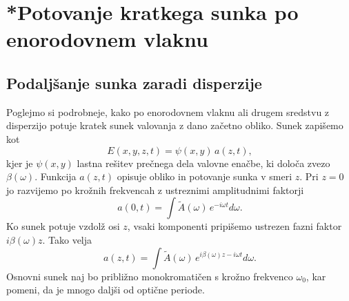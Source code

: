 \section{*Potovanje kratkega sunka po enorodovnem vlaknu}
\label{chap:sunvl}
\subsection*{Podaljšanje sunka zaradi disperzije}
Poglejmo si podrobneje, kako po enorodovnem vlaknu ali drugem
sredstvu z disperzijo potuje kratek sunek valovanja z dano začetno obliko.
Sunek zapišemo kot  
\begin{equation}
E\left(x, y, z, t\right)=\psi\left(x,y\right)\, a\left(z,t\right),
\label{9.61}
\end{equation}
kjer je $\psi\left(x,y\right)$ lastna rešitev prečnega dela valovne
enačbe, ki določa zvezo $\beta\left(\omega\right)$. 
Funkcija $a\left(z,t\right)$ opisuje obliko in potovanje sunka v smeri $z$. 
Pri $z=0$ jo razvijemo po krožnih frekvencah z ustreznimi amplitudnimi faktorji 
\begin{equation}
a\left(0,t\right)=\int \tilde{A}(\omega)\, e^{- i\omega t}d\omega.
\label{9.62}
\end{equation}
Ko sunek potuje vzdolž osi $z$, vsaki komponenti pripišemo
ustrezen fazni faktor $i \beta (\omega) z$. Tako velja
\begin{equation}
a\left(z,t\right)=\int \tilde{A}(\omega)\, e^{i \beta (\omega) z - i\omega t}d\omega.
\label{9.62f}
\end{equation}
Osnovni sunek naj bo približno monokromatičen s krožno frekvenco $\omega_{0}$,
kar pomeni, da je mnogo daljši od optične periode. 

